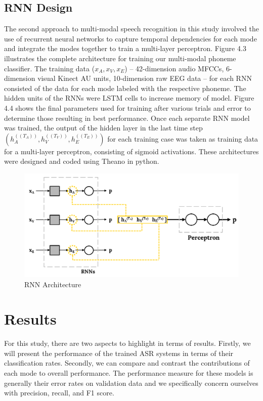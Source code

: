\documentclass[11pt,letterpaper]{article}
\begin{document}
\subsection{RNN Design}
The second approach to multi-modal speech recognition in this study involved the use of recurrent neural networks to capture temporal dependencies for each mode and integrate the modes together to train a multi-layer perceptron. Figure 4.3 illustrates the complete architecture for training our multi-modal phoneme classifier. The training data ($x_A,x_V,x_E$) – 42-dimension audio MFCCs, 6-dimension visual Kinect AU units, 10-dimension raw EEG data – for each RNN consisted of the data for each mode labeled with the respective phoneme. The hidden units of the RNNs were LSTM cells to increase memory of model. Figure 4.4 shows the final parameters used for training after various trials and error to determine those resulting in best performance. Once each separate RNN model was trained, the output of the hidden layer in the last time step $(h_A^((T_A ) ),h_V^((T_V ) ),h_E^((T_E ) ))$ for each training case was taken as training data for a multi-layer perceptron, consisting of sigmoid activations. These architectures were designed and coded using Theano in python.

\begin{figure}[h]
\centering
\includegraphics[scale=0.25]{rnn_design}
\caption{RNN Architecture}
\end{figure}


\section{Results}
For this study, there are two aspects to highlight in terms of results. Firstly, we will present the performance of the trained ASR systems in terms of their classification rates. Secondly, we can compare and contrast the contributions of each mode to overall performance. The performance measure for these models is generally their error rates on validation data and we specifically concern ourselves with precision, recall, and F1 score.
\end{document}
